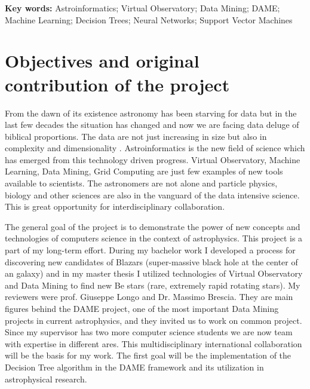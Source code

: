 \noindent \textbf{Key words:} Astroinformatics; Virtual Observatory; Data Mining;
DAME; Machine Learning; Decision Trees; Neural Networks; Support Vector
Machines

\section{Objectives and original contribution of the project}

\bigskip
\renewcommand{\LettrineFontHook}{\color{red}}


\lettrine[lines = 3, loversize=-0.1, lraise=0.1]{F}{}rom the dawn of
its existence astronomy has been starving for data but in the last few
decades the situation has changed and now we are facing data deluge of
biblical proportions. The data are not just increasing in size but
also in complexity and dimensionality
\cite{ballastroinformatics}. Astroinformatics is the new field of
science which has emerged from this technology driven progress.
Virtual Observatory, Machine Learning, Data Mining, Grid Computing are
just few examples of new tools available to scientists.  
The astronomers are not alone and particle physics, biology and other
sciences are also in the vanguard of the data intensive science. This
is great opportunity for interdisciplinary collaboration.



The general goal of the project is to demonstrate the power of new
concepts and technologies of computers science in the context of
astrophysics. This project is a part of my long-term effort. During my
bachelor work I developed a process for discovering new candidates of
Blazars (super-massive black hole at the center of an galaxy) and in my
master thesis I utilized technologies of Virtual Observatory and Data
Mining to find new Be stars (rare, extremely rapid rotating stars). My
reviewers were prof. Giuseppe Longo and Dr. Massimo Brescia. They are
main figures behind the DAME project, one of the most important Data
Mining projects in current astrophysics, and they invited us to work
on common project. Since my supervisor has two more computer science
students we are now team with expertise in different ares. This
multidisciplinary international collaboration will be the basis for my
work. The first goal will be the implementation of the Decision Tree
algorithm in the DAME framework and its utilization in astrophysical
research.


